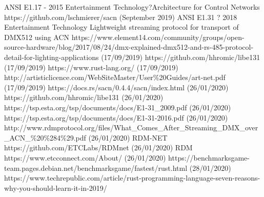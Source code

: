 \documentclass[11pt,a4paper]{report}
\begin{document}
	\begin{thebibliography}{9}
		ANSI E1.17 - 2015 Entertainment Technology?Architecture for Control Networks
		https://github.com/lschmierer/sacn (September 2019)
		ANSI E1.31 ? 2018 Entertainment Technology Lightweight streaming protocol for transport of DMX512 using ACN
		https://www.element14.com/community/groups/open-source-hardware/blog/2017/08/24/dmx-explained-dmx512-and-rs-485-protocol-detail-for-lighting-applications (17/09/2019)
		https://github.com/hhromic/libe131 (17/09/2019)
		https://www.rust-lang.org/ (17/09/2019)
		http://artisticlicence.com/WebSiteMaster/User\%20Guides/art-net.pdf (17/09/2019)
		https://docs.rs/sacn/0.4.4/sacn/index.html
		(26/01/2020)
		https://github.com/hhromic/libe131
		(26/01/2020)
		https://tsp.esta.org/tsp/documents/docs/E1-31\_2009.pdf
		(26/01/2020)
		https://tsp.esta.org/tsp/documents/docs/E1-31-2016.pdf
		(26/01/2020)
		http://www.rdmprotocol.org/files/What\_Comes\_After\_Streaming\_DMX\_over\_ACN\_\%20\%284\%29.pdf (26/01/2020)
		RDM-NET
		https://github.com/ETCLabs/RDMnet (26/01/2020)
		RDM
		https://www.etcconnect.com/About/ (26/01/2020)
		https://benchmarksgame-team.pages.debian.net/benchmarksgame/fastest/rust.html (28/01/2020)
		https://www.techrepublic.com/article/rust-programming-language-seven-reasons-why-you-should-learn-it-in-2019/
		
	\end{thebibliography}
	
\end{document}
